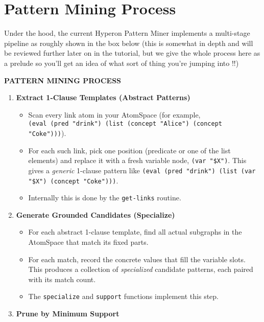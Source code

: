 \documentclass{article}
\begin{document}
\section{Pattern Mining Process}

Under the hood, the current Hyperon Pattern Miner implements a multi-stage pipeline as roughly shown in the box below (this is somewhat in depth and will be reviewed further later on in the tutorial, but we give the whole process here as a prelude so you'll get an idea of what sort of thing you're jumping into !!)

\begin{mdframed}

{\bf PATTERN MINING PROCESS}

\begin{enumerate}
  \item \textbf{Extract 1-Clause Templates (Abstract Patterns)}\\
  \begin{itemize}
    \item Scan every link atom in your AtomSpace (for example, \\
    \verb|(eval (pred "drink") (list (concept "Alice") (concept "Coke")))|).
   \item  For each such link, pick one position (predicate or one of the list elements)
    and replace it with a fresh variable node, \verb|(var "$X")|.  This gives
    a \emph{generic} 1-clause pattern like
    \verb|(eval (pred "drink") (list (var "$X") (concept "Coke")))|.  
   \item  Internally this is done by the \texttt{get-links} routine.
      \end{itemize}
  \item \textbf{Generate Grounded Candidates (Specialize)}
    \begin{itemize}
    \item For each abstract 1-clause template, find all actual subgraphs in the AtomSpace
    that match its fixed parts.  
    \item For each match, record the concrete values that
    fill the variable slots.  This produces a collection of \emph{specialized}
    candidate patterns, each paired with its match count.  
    \item The \texttt{specialize}
    and \texttt{support} functions implement this step.
      \end{itemize}
  \item \textbf{Prune by Minimum Support}
    \begin{itemize}

\end{itemize}
\end{enumerate}
\end{mdframed}
\end{document}
